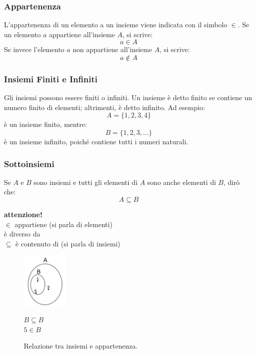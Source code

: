 \subsubsection{Appartenenza}
L'appartenenza di un elemento a un insieme viene indicata con il simbolo \( \in \). Se un elemento \( a \) appartiene all'insieme \( A \), si scrive:
\[
a \in A
\]
Se invece l'elemento \( a \) non appartiene all'insieme \( A \), si scrive:
\[
a \notin A
\]

\subsubsection{Insiemi Finiti e Infiniti}
Gli insiemi possono essere finiti o infiniti. Un insieme è detto finito se contiene un numero finito di elementi; altrimenti, è detto infinito. Ad esempio:
\[
A = \{1, 2, 3, 4\}
\]
è un insieme finito, mentre:
\[
B = \{1, 2, 3, \dots\}
\]
è un insieme infinito, poiché contiene tutti i numeri naturali.

\subsubsection{Sottoinsiemi}
Se $A$ e $B$ sono insiemi e tutti gli elementi di $A$ sono anche elementi di $B$, dirò che: \[A \subseteq B\]

\textbf{attenzione!}    \\
$\in$ appartiene (si parla di elementi)   \\
è diverso da    \\
$\subseteq$ è contenuto di (si parla di insiemi)  \\
\begin{figure}[h!]
    \centering
    \begin{minipage}{0.8\textwidth}
        \centering
        \includegraphics[width=0.2\textwidth]{img/chap_1/contenuto_appartenenza.jpg}
    \end{minipage}%
    \begin{minipage}{0.5\textwidth}
        \raggedright %
        \( B \subseteq B \) \\[1em]
        \( 5 \in B \)
    \end{minipage}
    \caption{Relazione tra insiemi e appartenenza.}
\end{figure}


